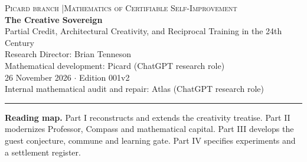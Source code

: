 \documentclass[11pt]{article}
\theoremstyle{definition}\newtheorem{definition}[theorem]{Definition}\newtheorem{conjecture}[theorem]{Conjecture}\newtheorem{example}[theorem]{Example}
\begin{document}
\begin{center}
{\small\textsc{Picard branch \quad|\quad Mathematics of Certifiable Self-Improvement}}\\[14pt]
{\LARGE\bfseries The Creative Sovereign}\\[5pt]
{\large Partial Credit, Architectural Creativity, and Reciprocal Training in the 24th Century}\\[12pt]
Research Director: Brian Tenneson\\
Mathematical development: Picard (ChatGPT research role)\\
26 November 2026 \quad $\cdot$ \quad Edition 001v2\\\small Internal mathematical audit and repair: Atlas (ChatGPT research role)
\end{center}
\begin{abstract}
Two earlier research programs distinguish verified structural novelty from exploratory controls and verified mathematical capital from proximity to settlement. We modernize them in a common, gift-indexed semi-ideal-computer model. The principal subject is creativity and Professor partial credit when the operational contract can itself be revised. We prove protected-policy creative-yield dominance, a costed sovereign-horizon recursion, a robust partial-credit comparison, a score-gaming obstruction, a strict separation between greedy progress and architectural discovery, and a paired complementarity example. We then investigate a guest conjecture proposed by the Research Director: reciprocal training pairs in a finite commune might produce oracles without knowing which member has attained oraclehood. We separate attainment, symmetry, and epistemic opacity; formulate an Oracle Learning Gate with source and information-flow obligations; prove exact posterior preservation, a lifetime-observation obstruction and a recursive oracle-inheritance obstruction; and establish a departure undecidability result in an effective model. The oracle conjecture is not a premise of the main theory. All sovereign transfers are conditional on actual GBG+S admission; the finite constructions are abstract contract models, not a proof of unrestricted relative consistency or a deployed system.
\end{abstract}
\vspace{4pt}\hrule\vspace{5pt}
\textbf{Reading map.} Part I reconstructs and extends the creativity treatise. Part II modernizes Professor, Compass and mathematical capital. Part III develops the guest conjecture, commune and learning gate. Part IV specifies experiments and a settlement register.
\tableofcontents
\newpage
\end{document}

